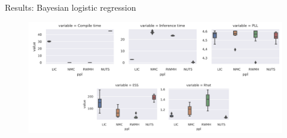 \begin{subframe}{Results: Bayesian logistic regression}
    \begin{figure}
        \centering
        \includegraphics[width=\textwidth]{Figures/lic/blr.png}
    \end{figure}
\end{subframe}

	
	
	



